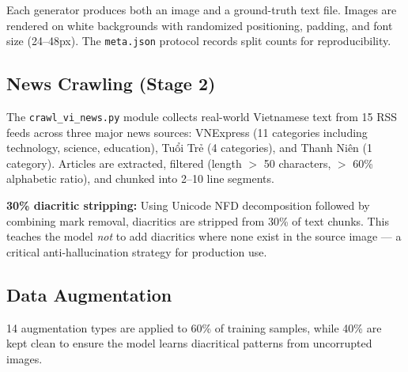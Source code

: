 \documentclass[11pt]{article}
\begin{document}
Each generator produces both an image and a ground-truth text file. 
Images are rendered on white backgrounds with randomized positioning, padding, and font size (24--48px). 
The \texttt{meta.json} protocol records split counts for reproducibility.

\subsection{News Crawling (Stage 2)}

The \texttt{crawl\_vi\_news.py} module collects real-world Vietnamese text from 15 RSS feeds across three major news sources: VNExpress (11 categories including technology, science, education), Tuổi Trẻ (4 categories), and Thanh Niên (1 category). 
Articles are extracted, filtered (length $>$ 50 characters, $>$ 60\% alphabetic ratio), and chunked into 2--10 line segments.

\textbf{30\% diacritic stripping:} Using Unicode NFD decomposition followed by combining mark removal, diacritics are stripped from 30\% of text chunks. 
This teaches the model \emph{not} to add diacritics where none exist in the source image --- a critical anti-hallucination strategy for production use.

\subsection{Data Augmentation}

14 augmentation types are applied to 60\% of training samples, while 40\% are kept clean to ensure the model learns diacritical patterns from uncorrupted images.

\begin{table}[t]
\centering
\scriptsize
{}
\caption{14 augmentation types with parameters. Stage 2 uses only 4 lighter types: blur, noise, JPEG, rotation.}
\label{tab:augmentation}
\end{table}
\end{document}
